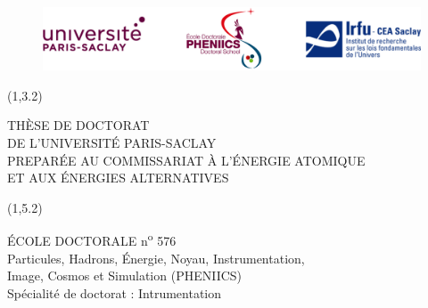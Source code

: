 
\tikzset{external/export=false}
\begin{titlepage}
  \thispagestyle{empty}
  
  
  \begin{figure}
    \vspace{-2cm}
    \hspace{0.5cm}
    \includegraphics[width=14cm]{00_Guards/Logos/Logo_ALL3.png}\\
    \vspace{1cm}
  \end{figure}
  
  \begin{textblock}{14}(1,3.2)
    \begin{center}
      \textcolor{blue!20!red!45!black!75!}
      {\uppercase{\Large Thèse de Doctorat \\ de L'Université Paris-Saclay \\ Preparée au Commissariat à l'Énergie atomique\\ et aux Énergies alternatives}}
    \end{center}
  \end{textblock}
  
  \begin{textblock}{14}(1,5.2)
    \begin{center}
      \normalsize
      \uppercase{école doctorale}	 n\textsuperscript{o} 576 \\
      Particules, Hadrons, \'{E}nergie, Noyau, Instrumentation, \\Image, Cosmos et Simulation (PHENIICS)\\
      Spécialité de doctorat : Intrumentation
    \end{center}
  \end{textblock}
  

\end{titlepage}
